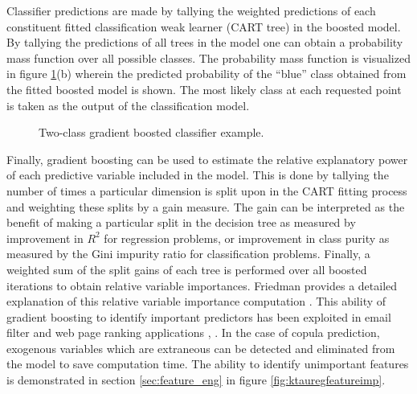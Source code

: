 Classifier predictions are made by tallying the weighted predictions of each constituent fitted classification weak learner (CART tree) in the boosted model.  By tallying the predictions of all trees in the model one can obtain a probability mass function over all possible classes.  The probability mass function is visualized in figure \ref{fig:gb3}(b) wherein the predicted probability of the ``blue'' class obtained from the fitted boosted model is shown. The most likely class at each requested point is taken as the output of the classification model.

\begin{figure}[H]%
    \centering
    \hspace*{-1.0em}%
    \caption{Two-class gradient boosted classifier example.}%
    \label{fig:gb3}%
\end{figure}

Finally, gradient boosting can be used to estimate the relative explanatory power of each predictive variable included in the model.  This is done by tallying the number of times a particular dimension is split upon in the CART fitting process and weighting these splits by a gain measure.  The gain can be interpreted as the benefit of making a particular split in the decision tree as measured by improvement in $R^2$ for regression problems, or improvement in class purity as measured by the Gini impurity ratio for classification problems.  Finally, a weighted sum of the split gains of each tree is performed over all boosted iterations to obtain relative variable importances. Friedman provides a detailed explanation of this relative variable importance computation \cite{friedman2001}.  This ability of gradient boosting to identify important predictors has been exploited in email filter and web page ranking applications \cite{chapelle2011}, \cite{Tyree2011}.  In the case of copula prediction, exogenous variables which are extraneous can be detected and eliminated from the model to save computation time.  The ability to identify unimportant features is demonstrated in section \ref{sec:feature_eng} in figure \ref{fig:ktauregfeatureimp}.
